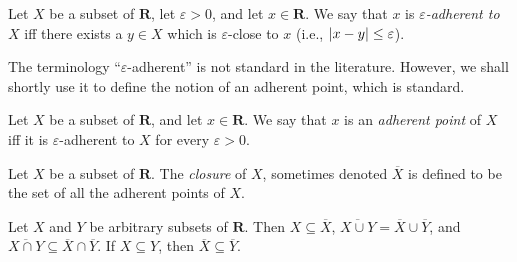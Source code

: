 \begin{definition}\label{9.1.5}
    Let \(X\) be a subset of \(\mathbf{R}\), let \(\varepsilon > 0\), and let \(x \in \mathbf{R}\).
    We say that \(x\) is \emph{\(\varepsilon\)-adherent to \(X\)} iff there exists a \(y \in X\) which is \(\varepsilon\)-close to \(x\)
    (i.e., \(\abs*{x - y} \leq \varepsilon\)).
\end{definition}

\begin{remark}\label{9.1.6}
    The terminology ``\(\varepsilon\)-adherent'' is not standard in the literature.
    However, we shall shortly use it to define the notion of an adherent point, which is standard.
\end{remark}

\setcounter{theorem}{7}
\begin{definition}\label{9.1.8}
    Let \(X\) be a subset of \(\mathbf{R}\), and let \(x \in \mathbf{R}\).
    We say that \(x\) is an \emph{adherent point} of \(X\) iff it is \(\varepsilon\)-adherent to \(X\) for every \(\varepsilon > 0\).
\end{definition}

\setcounter{theorem}{9}
\begin{definition}[Closure]\label{9.1.10}
    Let \(X\) be a subset of \(\mathbf{R}\).
    The \emph{closure} of \(X\), sometimes denoted \(\overline{X}\) is defined to be the set of all the adherent points of \(X\).
\end{definition}

\begin{lemma}\label{9.1.11}
    Let \(X\) and \(Y\) be arbitrary subsets of \(\mathbf{R}\).
    Then \(X \subseteq \overline{X}\), \(\overline{X \cup Y} = \overline{X} \cup \overline{Y}\), and \(\overline{X \cap Y} \subseteq \overline{X} \cap \overline{Y}\).
    If \(X \subseteq Y\), then \(\overline{X} \subseteq \overline{Y}\).
\end{lemma}

